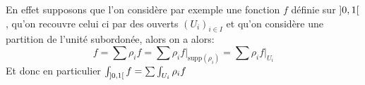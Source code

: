 En effet supposons que l'on considère par exemple une fonction \( f \) définie sur \( \ioo{0}{1} \), qu'on recouvre celui ci par des ouverts \( (U_i)_{i \in I} \) et qu'on considère une partition de l'unité subordonée, alors on a alors:
\[ 
   f = \sum \rho_i f = \sum \rho_i f \bigr|_{\text{supp}(\rho_i)} = \sum \rho_i f \bigr|_{U_i}
\]
Et donc en particulier \( \int_{\ioo{0}{1}} f = \sum \int_{U_i} \rho_i f  \)

